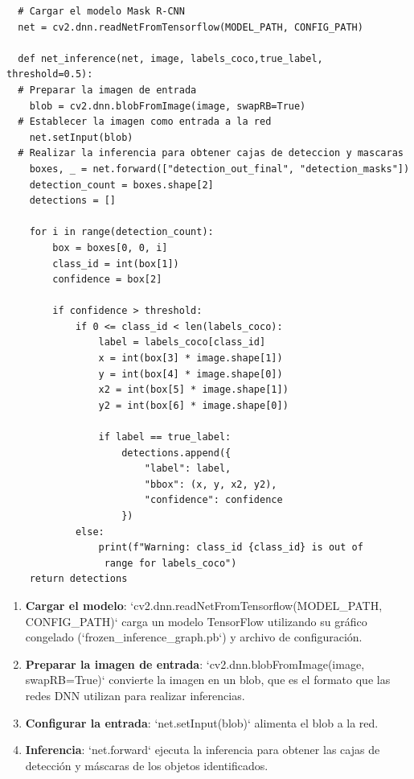 \documentclass{article}
\begin{document}
\begin{lstlisting}
  # Cargar el modelo Mask R-CNN
  net = cv2.dnn.readNetFromTensorflow(MODEL_PATH, CONFIG_PATH)

  def net_inference(net, image, labels_coco,true_label, threshold=0.5):
  # Preparar la imagen de entrada
    blob = cv2.dnn.blobFromImage(image, swapRB=True)
  # Establecer la imagen como entrada a la red
    net.setInput(blob)
  # Realizar la inferencia para obtener cajas de deteccion y mascaras
    boxes, _ = net.forward(["detection_out_final", "detection_masks"])
    detection_count = boxes.shape[2]
    detections = []

    for i in range(detection_count):
        box = boxes[0, 0, i]
        class_id = int(box[1])  
        confidence = box[2]

        if confidence > threshold:
            if 0 <= class_id < len(labels_coco):  
                label = labels_coco[class_id]
                x = int(box[3] * image.shape[1]) 
                y = int(box[4] * image.shape[0])
                x2 = int(box[5] * image.shape[1])
                y2 = int(box[6] * image.shape[0])
                
                if label == true_label:
                    detections.append({
                        "label": label,
                        "bbox": (x, y, x2, y2),
                        "confidence": confidence
                    })
            else:
                print(f"Warning: class_id {class_id} is out of
                 range for labels_coco")
    return detections
\end{lstlisting}
  
\begin{enumerate}
  \item \textbf{Cargar el modelo}: `cv2.dnn.readNetFromTensorflow(MODEL\_PATH, CONFIG\_PATH)` carga un modelo TensorFlow utilizando su gráfico congelado (`frozen\_inference\_graph.pb`) y archivo de configuración.
  \item \textbf{Preparar la imagen de entrada}: `cv2.dnn.blobFromImage(image, swapRB=True)` convierte la imagen en un blob, que es el formato que las redes DNN utilizan para realizar inferencias.
  \item \textbf{Configurar la entrada}: `net.setInput(blob)` alimenta el blob a la red.
  \item \textbf{Inferencia}: `net.forward` ejecuta la inferencia para obtener las cajas de detección y máscaras de los objetos identificados.
  
\end{enumerate}
\end{document}
